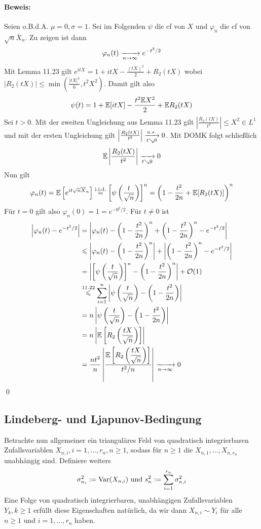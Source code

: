  \paragraph{Beweis:}Seien o.B.d.A. $\mu=0,\sigma=1$. Sei im Folgenden $\psi$ die cf von $X$ und $\varphi_n$ die cf von $\sqrt{n}\overline X_n$. Zu zeigen ist dann
 $$\varphi_n(t)\nto{}{n\to\infty}e^{-t^2/2}$$
 Mit Lemma 11.23 gilt $e^{itX}=1+itX-\frac{(tX)^2}{2}+R_2(tX)$
 wobei $|R_2(tX)|\leq\min\left(\frac{|tX|^3}{6},t^2X^2\right)$. Damit gilt also
 $$\psi(t)=1+\mathbb{E}[itX]-\dfrac{t^2\mathbb{E} X^2}{2}+\mathbb{E} R_2(tX)$$
 Sei $t>0$. Mit der zweiten Ungleichung aus Lemma 11.23 gilt $\left|\frac{R_2(tX)}{t^2}\right|\leq X^2\in L^1$ und mit der ersten Ungleichung gilt $\left|\frac{R_2(tX)}{t^2}\right|\nto{a.s.}{t\searrow0}0$. Mit DOMK folgt schlie\ss{}lich
 $$\E\left|\frac{R_2(tX)}{t^2}\right|\nto{}{t\searrow0}0$$
 Nun gilt
 $$\varphi_n(t)=\mathbb{E}\left[e^{it\sqrt{n}\overline X_n}\right]\overset{\text{i.i.d.}}{=}\left[\psi\left(\frac{t}{\sqrt{n}}\right)\right]^n=\left(1-\frac{t^2}{2n}+\mathbb{E}[R_2(tX)]\right)^n$$
 F\"ur $t=0$ gilt also $\varphi_n(0)=1=e^{-0^2/2}$.\newpage
 F\"ur $t\neq0$ ist 
 \begin{align*}
     \left|\varphi_n(t)-e^{-t^2/2}\right|&=\left|\varphi_n(t)-\left(1-\dfrac{t^2}{2n}\right)^n+\left(1-\dfrac{t^2}{2n}\right)^n-e^{-t^2/2}\right|\\
     &\leq\left|\varphi_n(t)-\left(1-\dfrac{t^2}{2n}\right)^n\right|+\left|\left(1-\dfrac{t^2}{2n}\right)^n-e^{-t^2/2}\right|\\
     &=\left|\left[\psi\left(\dfrac{t}{\sqrt{n}}\right)\right]^n-\left(1-\dfrac{t^2}{2n}\right)^n\right|+\mathcal{O}(1)\\
     &\overset{11.22}{\leq}\sum_{i=1}^n\left|\psi\left(\dfrac{t}{\sqrt{n}}\right)-\left(1-\dfrac{t^2}{2n}\right)\right|\\
     &=n\left|\psi\left(\dfrac{t}{\sqrt{n}}\right)-\left(1-\dfrac{t^2}{2n}\right)\right|\\
     &=n\left|\E \left[R_2\left(\dfrac{tX}{\sqrt{n}}\right)\right]\right|\\
     &=\dfrac{nt^2}{n}\left|\dfrac{\E \left[R_2\left(\dfrac{tX}{\sqrt{n}}\right)\right]}{t^2/n}\right|\nto{}{n\to\infty}0
 \end{align*}
 \qed
 
 \subsection*{Lindeberg- und Ljapunov-Bedingung}
 Betrachte nun allgemeiner ein triangul\"ares Feld von quadratisch integrierbaren Zufallsvariablen $X_{n,i},i=1,\hdots,r_n,n\geq1$, sodass f\"ur $n\geq1$ die $X_{n,1},\hdots,X_{n,r_n}$ unabh\"angig sind. Definiere weiters
 $$\sigma_{n_i}^2:=\operatorname{Var}(X_{n,i})\text{ und }s_n^2:=\sum_{i=1}^{r_n}\sigma_{n,i}^2$$
 Eine Folge von quadratisch integrierbaren, unabh\"angigen Zufallsvariablen $Y_k,k\geq1$ erf\"ullt diese Eigenschaften nat\"urlich, da wir dann $X_{n,i}\sim Y_i$ f\"ur alle $n\geq1$ und $i=1,\hdots,r_n$ haben.

